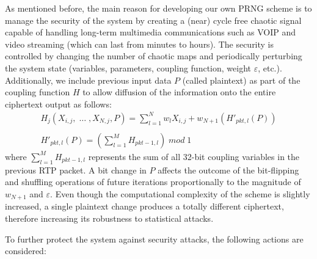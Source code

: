 \documentclass[preprint]{elsarticle}
\begin{document}
As mentioned before, the main reason for developing our own PRNG scheme is to manage the security of the system by creating a (near) cycle free chaotic signal capable of handling long-term multimedia communications such as VOIP and video streaming (which can last from minutes to hours). The security is controlled by changing the number of chaotic maps and periodically perturbing the system state (variables, parameters, coupling function, weight $\varepsilon$, etc.). Additionally, we include previous input data $P$ (called plaintext) as part of the coupling function $H$ to allow diffusion of the information onto the entire ciphertext output as follows:
\begin{equation}
\begin{array}{c}
\displaystyle{
H_{j}(X_{i,j},\; \ldots \; ,	X_{N,j},P)= \sum_{l=1}^{N}w_{l}X_{i,j}+ w_{N+1}\left(H'_{pkt,l}(P)\right)
} 
 \\
 \\
\displaystyle{
H'_{pkt,l}(P)=  \left(\sum_{l=1}^{M}H_{pkt-1,l} \right) \; mod \; 1
}
\end{array}
\label{ec3}
\end{equation}
where $\sum_{l=1}^{M}H_{pkt-1,l} $ represents the sum of all 32-bit coupling variables in the previous RTP packet. A bit change in $P$ affects the outcome of the bit-flipping and shuffling operations of future iterations proportionally to the magnitude of $w_{N+1}$ and $\varepsilon$. Even though the computational complexity of the scheme is slightly increased, a single plaintext change produces a totally different ciphertext, therefore increasing its robustness to statistical attacks. 

To further protect the system against security attacks, the following actions are considered:
\end{document}
